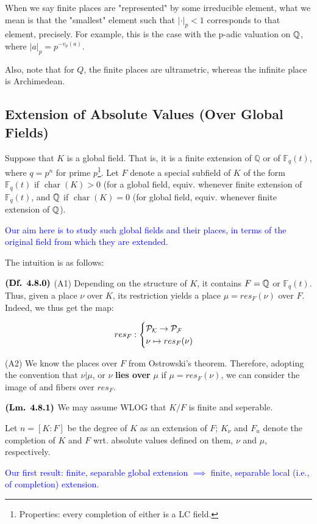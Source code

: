 \documentclass{article}
\DeclareMathOperator{\chars}{char}
\begin{document}
When we say finite places are "represented" by some irreducible element, what we mean is that the "smallest" element such that $|\cdot|_p < 1$ corresponds to that element, precisely. For example, this is the case with the p-adic valuation on $\mathbb{Q}$, where $|a|_p = p^{-v_p(a)}$.

Also, note that for $Q$, the finite places are ultrametric, whereas the infinite place is Archimedean.

\subsection{Extension of Absolute Values (Over Global Fields)}
Suppose that $K$ is a global field. That is, it is a finite extension of $\mathbb{Q}$ or of $\mathbb{F}_q(t)$, where $q = p^n$ for prime $p$\footnote{Properties: every completion of either is a LC field.}. Let $F$ denote a special subfield of $K$ of the form $\mathbb{F}_q(t)$ if $\chars(K)>0$ (for a global field, equiv. whenever finite extension of $\mathbb{F}_q(t)$, and $\mathbb{Q}$ if $\chars(K) = 0$ (for global field, equiv. whenever finite extension of $\mathbb{Q}$).

\textcolor{blue}{Our aim here is to study such global fields and their places, in terms of the original field from which they are extended.}

The intuition is as follows:

$\textbf{(Df. 4.8.0)}$
(A1) Depending on the structure of $K$, it contains $F = \mathbb{Q}$ or $\mathbb{F}_q(t)$. Thus, given a place $\nu$ over $K$, its restriction yields a place $\mu = res_F(\nu)$ over $F$. Indeed, we thus get the map:

$$res_F: \begin{cases}
    \mathcal{P_K} \rightarrow \mathcal{P_F} \\
    \nu \mapsto res_F(\nu)
\end{cases}$$

(A2) We know the places over $F$ from Ostrowski's theorem. Therefore, adopting the convention that $\nu | \mu$, or $\nu$ \textbf{lies over} $\mu$ if $\mu = res_F(\nu)$, we can consider the image of and fibers over $res_F$.

$\textbf{(Lm. 4.8.1)}$ We may assume WLOG that $K/F$ is finite and seperable.

Let $n = [K:F]$ be the degree of $K$ as an extension of $F$; $K_{\nu}$ and $F_{u}$ denote the completion of $K$ and $F$ wrt. absolute values defined on them, $\nu$ and $\mu$, respectively.

\textcolor{blue}{Our first result: finite, separable global extension $\implies$ finite, separable local (i.e., of completion) extension.}
\end{document}
